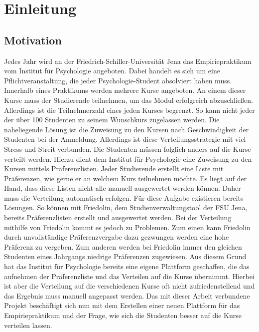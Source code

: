 \chapter{Einleitung}
\label{chapter:introduction}

    \section{Motivation}
    \label{sec:motivation}
        Jedes Jahr wird an der Friedrich-Schiller-Universität Jena das Empiriepraktikum vom Institut für Psychologie angeboten.
        Dabei handelt es sich um eine Pflichtveranstaltung, die jeder Psychologie-Student absolviert haben muss.
        Innerhalb eines Praktikums werden mehrere Kurse angeboten.
        An einem dieser Kurse muss der Studierende teilnehmen, um das Modul erfolgreich abzuschließen.
        Allerdings ist die Teilnehmerzahl eines jeden Kurses begrenzt.
        So kann nicht jeder der über 100 Studenten zu seinem Wunschkurs zugelassen werden.
        Die naheliegende Lösung ist die Zuweisung zu den Kursen nach Geschwindigkeit der Studenten bei der Anmeldung.
        Allerdings ist diese Verteilungsstrategie mit viel Stress und Streit verbunden.
        Die Studenten müssen folglich anders auf die Kurse verteilt werden.
        Hierzu dient dem Institut für Psychologie eine Zuweisung zu den Kursen mittels Präferenzlisten.
        Jeder Studierende erstellt eine Liste mit Präferenzen, wie gerne er an welchem Kurs teilnehmen möchte.
        Es liegt auf der Hand, dass diese Listen nicht alle manuell ausgewertet werden können. Daher muss die Verteilung automatisch erfolgen.
        Für diese Aufgabe existieren bereits Lösungen.
        So können mit Friedolin, dem Studienverwaltungstool der FSU Jena, bereits Präferenzlisten erstellt und ausgewertet werden.
        Bei der Verteilung mithilfe von Friedolin kommt es jedoch zu Problemen. Zum einen kann Friedolin durch unvollständige Präferenzvergabe dazu gezwungen werden eine hohe Präferenz zu vergeben. Zum anderen werden bei Friedolin immer den gleichen Studenten eines Jahrgangs niedrige Präferenzen zugewiesen. 
        Aus diesem Grund hat das Institut für Psychologie bereits eine eigene Plattform geschaffen, die das aufnehmen der Präferenzliste und das Verteilen auf die Kurse übernimmt.
        Hierbei ist aber die Verteilung auf die verschiedenen Kurse oft nicht zufriedenstellend und das Ergebnis muss manuell angepasst werden.
        Das mit dieser Arbeit verbundene Projekt beschäftigt sich nun mit dem Erstellen einer neuen Plattform für das Empiriepraktikum und der Frage, wie sich die Studenten besser auf die Kurse verteilen lassen.
        
